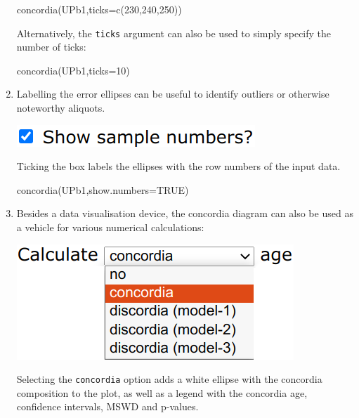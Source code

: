 \begin{refsection}
\begin{enumerate}
\begin{console}
concordia(UPb1,ticks=c(230,240,250))
\end{console}

Alternatively, the \texttt{ticks} argument can also be used to simply
specify the number of ticks:

\begin{console}
concordia(UPb1,ticks=10)
\end{console}

\item Labelling the error ellipses can be useful to identify outliers
  or otherwise noteworthy aliquots.

  \noindent\begin{minipage}[t]{.25\linewidth}
  \strut\vspace*{-\baselineskip}\newline
  \includegraphics[width=\linewidth]{../figures/concordiashownumbers.png}
\end{minipage}
\begin{minipage}[t]{.75\linewidth}
  Ticking the box labels the ellipses with the row numbers of the
  input data.
\end{minipage}

\begin{console}
concordia(UPb1,show.numbers=TRUE)
\end{console}

\item Besides a data visualisation device, the concordia diagram can
  also be used as a vehicle for various numerical calculations:

\noindent\begin{minipage}[t]{.3\linewidth}
  \strut\vspace*{-\baselineskip}\newline
  \includegraphics[width=\linewidth]{../figures/ConcordiaShowAge.png}
\end{minipage}
\begin{minipage}[t]{.7\linewidth}
  Selecting the \texttt{concordia} option adds a white ellipse with
  the concordia composition to the plot, as well as a legend with the
  concordia age, confidence intervals, MSWD and p-values.
\end{minipage}


\end{enumerate}
\end{refsection}
